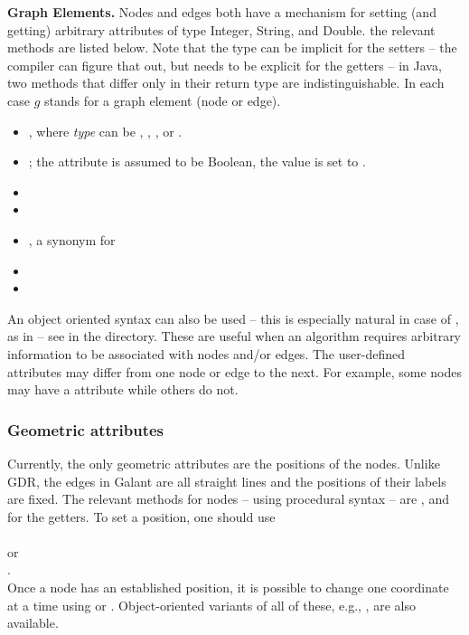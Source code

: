 \bigskip
\textbf{Graph Elements.}
Nodes and edges both have a mechanism for setting (and getting)
arbitrary attributes of type Integer, String, and Double.
the relevant methods are listed below.
Note that the type can be implicit for the setters -- the compiler can figure
that out, but needs to be explicit for the getters -- in Java, two methods
that differ only in their return type are indistinguishable.
In each case $g$ stands for a graph element (node or edge).
\begin{itemize}
  \item {},
    where \emph{type} can be , , ,
    or .
  \item {}; the attribute is assumed to
    be Boolean, the value is set to .
  \item {}
  \item {}
    \item {}, a synonym for
  \item {}
  \item {}
\end{itemize}
An object oriented syntax can also be used -- this is especially natural in
case of , as in  -- see  in the
 directory.
These are useful when an algorithm requires arbitrary information to be
associated with nodes and/or edges.
The user-defined attributes may differ from one node or edge to the next.
For example, some nodes may have a  attribute while others do not.

\subsubsection{Geometric attributes}

Currently, the only geometric attributes are the positions of the
nodes. 
Unlike GDR, the edges in Galant
are all straight lines and the positions of their labels are fixed.
The relevant methods for nodes -- using procedural syntax -- are
, 
and 
for the getters. To set a position,
one should use\\
\hspace*{2em}\\
or\\
\hspace*{2em}.\\
Once a node has an established position, it is possible to change
one coordinate at a time using  or .
Object-oriented variants of all of these, e.g.,
, are also available.


